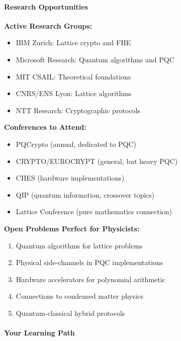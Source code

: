 \documentclass[11pt,a4paper]{article}
\begin{document}
\paragraph{Research Opportunities}

\textbf{Active Research Groups:}
\begin{itemize}
    \item IBM Zurich: Lattice crypto and FHE
    \item Microsoft Research: Quantum algorithms and PQC
    \item MIT CSAIL: Theoretical foundations
    \item CNRS/ENS Lyon: Lattice algorithms
    \item NTT Research: Cryptographic protocols
\end{itemize}

\textbf{Conferences to Attend:}
\begin{itemize}
    \item PQCrypto (annual, dedicated to PQC)
    \item CRYPTO/EUROCRYPT (general, but heavy PQC)
    \item CHES (hardware implementations)
    \item QIP (quantum information, crossover topics)
    \item Lattice Conference (pure mathematics connection)
\end{itemize}

\textbf{Open Problems Perfect for Physicists:}
\begin{enumerate}
    \item Quantum algorithms for lattice problems
    \item Physical side-channels in PQC implementations
    \item Hardware accelerators for polynomial arithmetic
    \item Connections to condensed matter physics
    \item Quantum-classical hybrid protocols
\end{enumerate}

\paragraph{Your Learning Path}
\end{document}
